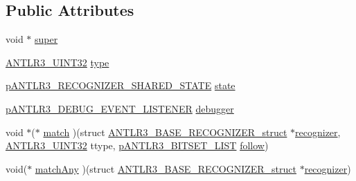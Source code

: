 \subsection*{Public Attributes}
\begin{DoxyCompactItemize}
\item 
void $\ast$ \hyperlink{struct_a_n_t_l_r3___b_a_s_e___r_e_c_o_g_n_i_z_e_r__struct_a8f0a0953113252a8f7f65e31c945631a}{super}
\item 
\hyperlink{antlr3defs_8h_ac41f744abd0fd25144b9eb9d11b1dfd1}{A\-N\-T\-L\-R3\-\_\-\-U\-I\-N\-T32} \hyperlink{struct_a_n_t_l_r3___b_a_s_e___r_e_c_o_g_n_i_z_e_r__struct_a8e26637c9f4d19ff4bcc9984a04b0ef5}{type}
\item 
\hyperlink{antlr3interfaces_8h_a180526531b2c6da5cafe825ae7596bf1}{p\-A\-N\-T\-L\-R3\-\_\-\-R\-E\-C\-O\-G\-N\-I\-Z\-E\-R\-\_\-\-S\-H\-A\-R\-E\-D\-\_\-\-S\-T\-A\-T\-E} \hyperlink{struct_a_n_t_l_r3___b_a_s_e___r_e_c_o_g_n_i_z_e_r__struct_aff56a30644716edb24915f621b6df701}{state}
\item 
\hyperlink{antlr3interfaces_8h_ab226a624395fcc0b8fe2b29ae60b6116}{p\-A\-N\-T\-L\-R3\-\_\-\-D\-E\-B\-U\-G\-\_\-\-E\-V\-E\-N\-T\-\_\-\-L\-I\-S\-T\-E\-N\-E\-R} \hyperlink{struct_a_n_t_l_r3___b_a_s_e___r_e_c_o_g_n_i_z_e_r__struct_a5c94b88fd42cac2bfc91648489bb81c0}{debugger}
\item 
void $\ast$($\ast$ \hyperlink{struct_a_n_t_l_r3___b_a_s_e___r_e_c_o_g_n_i_z_e_r__struct_abdaa022d2f256393fbb0f506d6ba8dd4}{match} )(struct \hyperlink{struct_a_n_t_l_r3___b_a_s_e___r_e_c_o_g_n_i_z_e_r__struct}{A\-N\-T\-L\-R3\-\_\-\-B\-A\-S\-E\-\_\-\-R\-E\-C\-O\-G\-N\-I\-Z\-E\-R\-\_\-struct} $\ast$\hyperlink{struct_a_n_t_l_r3___b_a_s_e___r_e_c_o_g_n_i_z_e_r__struct_aa7ab273aa44860cea6cd6e41528b57af}{recognizer}, \hyperlink{antlr3defs_8h_ac41f744abd0fd25144b9eb9d11b1dfd1}{A\-N\-T\-L\-R3\-\_\-\-U\-I\-N\-T32} ttype, \hyperlink{antlr3interfaces_8h_a59ad40804c151729987ddc3e78c2d95f}{p\-A\-N\-T\-L\-R3\-\_\-\-B\-I\-T\-S\-E\-T\-\_\-\-L\-I\-S\-T} \hyperlink{struct_a_n_t_l_r3___b_a_s_e___r_e_c_o_g_n_i_z_e_r__struct_a7bff9fe6af6e7c6ddccd99de75fb034b}{follow})
\item 
void($\ast$ \hyperlink{struct_a_n_t_l_r3___b_a_s_e___r_e_c_o_g_n_i_z_e_r__struct_a67f20df806406e1ff3787f67399c6ee6}{match\-Any} )(struct \hyperlink{struct_a_n_t_l_r3___b_a_s_e___r_e_c_o_g_n_i_z_e_r__struct}{A\-N\-T\-L\-R3\-\_\-\-B\-A\-S\-E\-\_\-\-R\-E\-C\-O\-G\-N\-I\-Z\-E\-R\-\_\-struct} $\ast$\hyperlink{struct_a_n_t_l_r3___b_a_s_e___r_e_c_o_g_n_i_z_e_r__struct_aa7ab273aa44860cea6cd6e41528b57af}{recognizer})
\item 

\end{DoxyCompactItemize}
